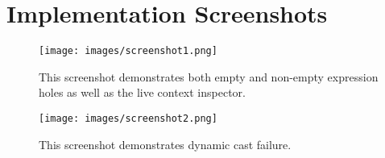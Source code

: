 
\section{Implementation Screenshots}
\label{sec:impl-screenshots}

\begin{figure}[h]
\texttt{[image: images/screenshot1.png]}
\caption{This screenshot demonstrates both empty and non-empty expression holes as well as the live context inspector.}
\end{figure}

\begin{figure}[h]
\texttt{[image: images/screenshot2.png]}
\caption{This screenshot demonstrates dynamic cast failure.}
\end{figure}

